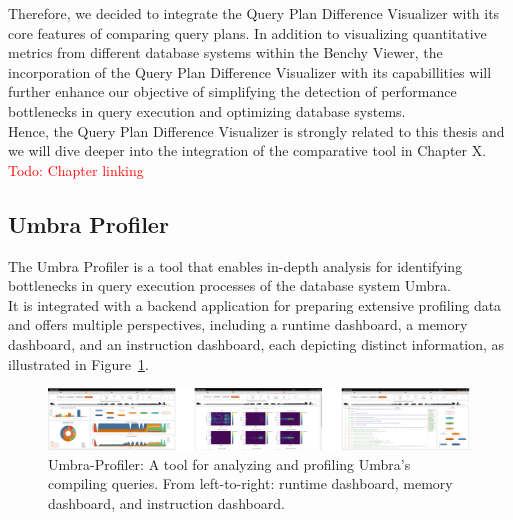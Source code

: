 Therefore, we decided to integrate the Query Plan Difference Visualizer with its core features of comparing query plans. In addition to visualizing quantitative metrics from different database systems within the Benchy Viewer, the incorporation of the Query Plan Difference Visualizer with its capabillities will further enhance our objective of simplifying the detection of performance bottlenecks in query execution and optimizing database systems. \\Hence, the Query Plan Difference Visualizer is strongly related to this thesis and we will dive deeper into the integration of the comparative tool in Chapter X. \textcolor{red}{Todo: Chapter linking}



\subsection{Umbra Profiler}
The Umbra Profiler is a tool that enables in-depth analysis for identifying bottlenecks in query execution processes of the database system Umbra.
\\ It is integrated with a backend application for preparing extensive profiling data and offers multiple perspectives, including a runtime dashboard, a memory dashboard, and an instruction dashboard, each depicting distinct information, as illustrated in Figure~\ref{fig:umbra-profiler}.

\begin{figure}[h]
  \centering
  \includegraphics[width=1\linewidth]{figures/umbra-profiler.png}
  \caption{Umbra-Profiler: A tool for analyzing and profiling Umbra’s compiling queries. From left-to-right: runtime dashboard, memory dashboard, and instruction dashboard.}
  \label{fig:umbra-profiler}
\end{figure}

